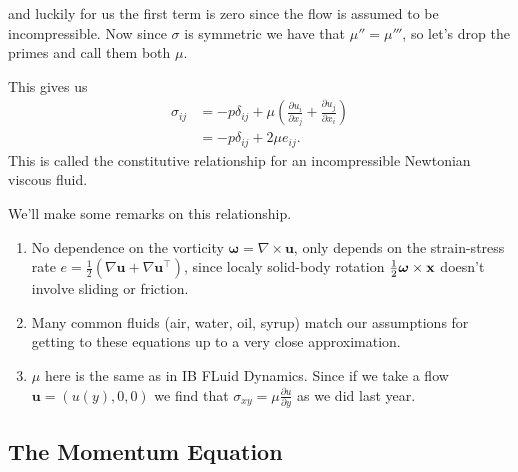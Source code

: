 \documentclass{article}
\begin{document}
and luckily for us the first term is zero since the flow is assumed to be incompressible. Now since $ \sigma $ is symmetric we have that $ \mu'' = \mu''' $, so let's drop the primes and call them both $ \mu $.\par
This gives us 
\begin{align*}
	\sigma_{ij} & =-p \delta_{ij} + \mu \left(\frac{\partial u_i}{\partial x_j} + \frac{\partial u_j}{\partial x_i}\right) \\
	&= - p \delta_{ij} + 2\mu e_{ij}.
\end{align*}
This is called the constitutive relationship for an incompressible Newtonian viscous fluid.
\begin{remark}
  We'll make some remarks on this relationship.
  \begin{enumerate}
	  \item No dependence on the vorticity $ \boldsymbol\omega = \nabla\times\mathbf u $, only depends on the strain-stress rate $ e = \frac 12 (\nabla \mathbf u + \nabla\mathbf u^\top) $, since localy solid-body rotation $ \frac 12 \boldsymbol\omega \times \mathbf{x} $ doesn't involve sliding or friction.
	  \item Many common fluids (air, water, oil, syrup) match our assumptions for getting to these equations up to a very close approximation. 
	  \item $ \mu $ here is the same as in IB FLuid Dynamics. Since if we take a flow $ \mathbf u = (u(y),0,0) $ we find that $ \sigma_{xy} = \mu\frac{\partial u}{\partial y} $ as we did last year.
  \end{enumerate}
\end{remark}
\subsection{The Momentum Equation}
\end{document}
